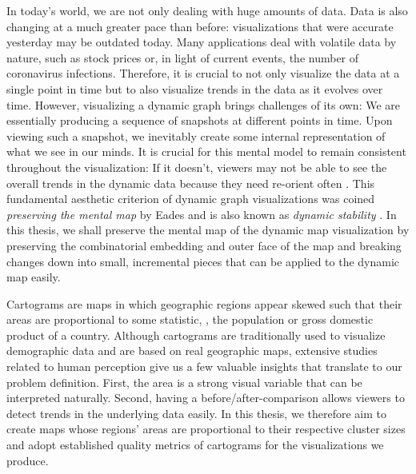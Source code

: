 In today's world, we are not only dealing with huge amounts of data.
Data is also changing at a much greater pace than before: visualizations that were accurate yesterday may be outdated today.
Many applications deal with volatile data by nature, such as stock prices or, in light of current events, the number of coronavirus infections.
Therefore, it is crucial to not only visualize the data at a single point in time but to also visualize trends in the data as it evolves over time.
However, visualizing a dynamic graph brings challenges of its own:
We are essentially producing a sequence of snapshots at different points in time.
Upon viewing such a snapshot, we inevitably create some internal representation of what we see in our minds.
It is crucial for this mental model to remain consistent throughout the visualization:
If it doesn't, viewers may not be able to see the overall trends in the dynamic data because they need re-orient often \cite{bohringer1990using} \cite{lee2006mental} \cite{purchase2006important}.
This fundamental aesthetic criterion of dynamic graph visualizations was coined \emph{preserving the mental map} by Eades \etal{} \cite{eades1991preserving} \cite{misue1995layout} and is also known as \emph{dynamic stability} \cite{diehl2002graphs}.
In this thesis, we shall preserve the mental map of the dynamic map visualization by preserving the combinatorial embedding and outer face of the map and breaking changes down into small, incremental pieces that can be applied to the dynamic map easily.

Cartograms are maps in which geographic regions appear skewed such that their areas are proportional to some statistic, \eg{}, the population or gross domestic product of a country.
Although cartograms are traditionally used to visualize demographic data and are based on real geographic maps, extensive studies related to human perception \cite{nusrat2016state} \cite{nusrat2018evaluating} give us a few valuable insights that translate to our problem definition.
First, the area is a strong visual variable that can be interpreted naturally.
Second, having a before/after-comparison allows viewers to detect trends in the underlying data easily.
In this thesis, we therefore aim to create maps whose regions' areas are proportional to their respective cluster sizes and adopt established quality metrics of cartograms for the visualizations we produce.

